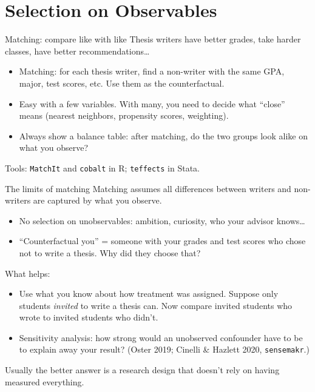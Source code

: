 \documentclass[aspectratio=169,11pt]{beamer}
\begin{document}
\section{Selection on Observables}

\begin{frame}{Matching: compare like with like}
Thesis writers have better grades, take harder classes, have better recommendations\ldots
\begin{itemize}
	\item \alert{Matching}: for each thesis writer, find a non-writer with the same GPA, major, test scores, etc. Use them as the counterfactual.
	\item Easy with a few variables. With many, you need to decide what ``close'' means (nearest neighbors, propensity scores, weighting).
	\item Always show a \alert{balance table}: after matching, do the two groups look alike on what you observe?
\end{itemize}
\medskip
Tools: \texttt{MatchIt} and \texttt{cobalt} in R; \texttt{teffects} in Stata.
\end{frame}


\begin{frame}{The limits of matching}
Matching assumes \alert{all} differences between writers and non-writers are captured by what you observe.
\begin{itemize}
	\item No \alert{selection on unobservables}: ambition, curiosity, who your advisor knows\ldots
	\item ``Counterfactual you'' = someone with your grades and test scores who chose not to write a thesis. Why did they choose that?
\end{itemize}
\medskip
What helps:
\begin{itemize}
	\item Use what you know about \alert{how treatment was assigned}. Suppose only students \emph{invited} to write a thesis can. Now compare invited students who wrote to invited students who didn't.
	\item \alert{Sensitivity analysis}: how strong would an unobserved confounder have to be to explain away your result? (Oster 2019; Cinelli \& Hazlett 2020, \texttt{sensemakr}.)
\end{itemize}
\medskip
Usually the better answer is a \alert{research design} that doesn't rely on having measured everything.
\end{frame}
\end{document}
